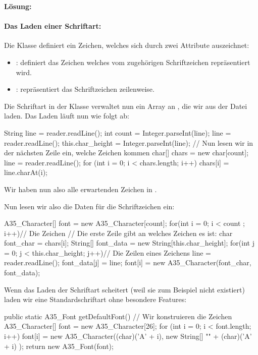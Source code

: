 \documentclass[table]{sopra-base}
\makeatletter
\newenvironment{solution}{\null\par\noindent\textbf{\textcolor{sob@col@uulm@cs}{Lösung:}}\newline\bgroup\color{black}\slshape\ignorespaces}{\egroup}
\makeatother
\begin{document}
\begin{solution}
    \paragraph{Das Laden einer Schriftart:}
    \bgroup
        Die Klasse  definiert ein Zeichen, welches sich durch zwei
        Attribute auszeichnet:
        \begin{itemize}[nolistsep]
            \item {}: definiert das Zeichen welches vom zugehörigen Schriftzeichen repräsentiert wird.
            \item {}: repräsentiert das Schriftzeichen zeilenweise.
        \end{itemize}
        Die Schriftart in der Klasse  verwaltet nun ein Array an , die wir aus der Datei laden. Das Laden läuft nun wie folgt ab:
\begin{java}[firstnumber=66]
String line = reader.readLine();
int count = Integer.parseInt(line);
line = reader.readLine();
this.char_height = Integer.parseInt(line);
// Nun lesen wir in der nächsten Zeile ein, welche Zeichen kommen
char[] chars = new char[count];
line = reader.readLine();
for (int i = 0; i < chars.length; i++)
    chars[i] = line.charAt(i);
\end{java}
Wir haben nun also alle erwartenden Zeichen in . \par{}
Nun lesen wir also die Daten für die Schriftzeichen ein:
\begin{java}[firstnumber=75]
A35_Character[] font = new A35_Character[count];
for(int i = 0; i < count ; i++){// Die Zeichen
    // Die erste Zeile gibt an welches Zeichen es ist:
    char font_char = chars[i];
    String[] font_data = new String[this.char_height];
    for(int j = 0; j < this.char_height; j++){// Die Zeilen eines Zeichens
        line = reader.readLine();
        font_data[j] = line;
    }
    font[i] = new A35_Character(font_char, font_data);
}
\end{java}
    Wenn das Laden der Schriftart scheitert (weil sie zum Beispiel nicht existiert) laden wir eine Standardschriftart ohne besondere Features:
\begin{java}[firstnumber=102]
public static A35_Font getDefaultFont(){
    // Wir konstruieren die Zeichen
    A35_Character[] font = new A35_Character[26];
    for (int i = 0; i < font.length; i++) {
        font[i] = new A35_Character((char)('A' + i),
                        new String[] {"" + (char)('A' + i)}
                  );
    }
    return new A35_Font(font);
}
\end{java}

\end{solution}
\end{document}
